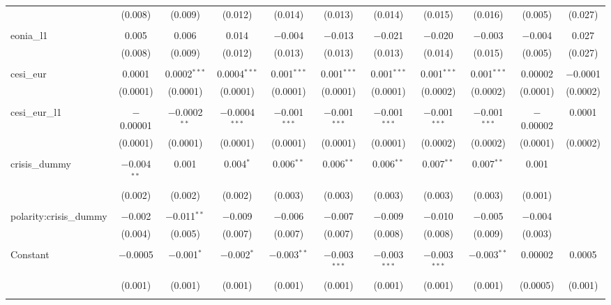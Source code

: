 \begin{table}[!htbp]
\begin{adjustbox}{width=1.35\textwidth}
\begin{tabular}{@{\extracolsep{5pt}}lcccccccccc}
  & (0.008) & (0.009) & (0.012) & (0.014) & (0.013) & (0.014) & (0.015) & (0.016) & (0.005) & (0.027) \\ 
  & & & & & & & & & & \\ 
 eonia\_l1 & 0.005 & 0.006 & 0.014 & $-$0.004 & $-$0.013 & $-$0.021 & $-$0.020 & $-$0.003 & $-$0.004 & 0.027 \\ 
  & (0.008) & (0.009) & (0.012) & (0.013) & (0.013) & (0.013) & (0.014) & (0.015) & (0.005) & (0.027) \\ 
  & & & & & & & & & & \\ 
 cesi\_eur & 0.0001 & 0.0002$^{***}$ & 0.0004$^{***}$ & 0.001$^{***}$ & 0.001$^{***}$ & 0.001$^{***}$ & 0.001$^{***}$ & 0.001$^{***}$ & 0.00002 & $-$0.0001 \\ 
  & (0.0001) & (0.0001) & (0.0001) & (0.0001) & (0.0001) & (0.0001) & (0.0002) & (0.0002) & (0.0001) & (0.0002) \\ 
  & & & & & & & & & & \\ 
 cesi\_eur\_l1 & $-$0.00001 & $-$0.0002$^{**}$ & $-$0.0004$^{***}$ & $-$0.001$^{***}$ & $-$0.001$^{***}$ & $-$0.001$^{***}$ & $-$0.001$^{***}$ & $-$0.001$^{***}$ & $-$0.00002 & 0.0001 \\ 
  & (0.0001) & (0.0001) & (0.0001) & (0.0001) & (0.0001) & (0.0001) & (0.0002) & (0.0002) & (0.0001) & (0.0002) \\ 
  & & & & & & & & & & \\ 
 crisis\_dummy & $-$0.004$^{**}$ & 0.001 & 0.004$^{*}$ & 0.006$^{**}$ & 0.006$^{**}$ & 0.006$^{**}$ & 0.007$^{**}$ & 0.007$^{**}$ & 0.001 &  \\ 
  & (0.002) & (0.002) & (0.002) & (0.003) & (0.003) & (0.003) & (0.003) & (0.003) & (0.001) &  \\ 
  & & & & & & & & & & \\ 
 polarity:crisis\_dummy & $-$0.002 & $-$0.011$^{**}$ & $-$0.009 & $-$0.006 & $-$0.007 & $-$0.009 & $-$0.010 & $-$0.005 & $-$0.004 &  \\ 
  & (0.004) & (0.005) & (0.007) & (0.007) & (0.007) & (0.008) & (0.008) & (0.009) & (0.003) &  \\ 
  & & & & & & & & & & \\ 
 Constant & $-$0.0005 & $-$0.001$^{*}$ & $-$0.002$^{*}$ & $-$0.003$^{**}$ & $-$0.003$^{***}$ & $-$0.003$^{***}$ & $-$0.003$^{***}$ & $-$0.003$^{**}$ & 0.00002 & 0.0005 \\ 
  & (0.001) & (0.001) & (0.001) & (0.001) & (0.001) & (0.001) & (0.001) & (0.001) & (0.0005) & (0.001) \\ 
  & & & & & & & & & & \\ 

\end{tabular}
\end{adjustbox}
\end{table}
